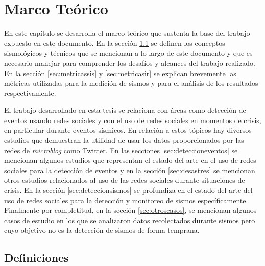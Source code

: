 \chapter{Marco Teórico}
\label{cap:marco}

En este capítulo se desarrolla el marco teórico que sustenta la base del trabajo expuesto en este documento. En la sección \ref{sec:glosario} se definen los conceptos sismológicos y técnicos que se mencionan a lo largo de este documento y que es necesario manejar para comprender los desafíos y alcances del trabajo realizado. En la sección \ref{sec:metricassis} y \ref{sec:metricasir} se explican brevemente las métricas utilizadas para la medición de sismos y para el análisis de los resultados respectivamente. 

El trabajo desarrollado en esta tesis se relaciona con áreas como detección de eventos usando redes sociales y con el uso de redes sociales en momentos de crisis, en particular durante eventos sísmicos. En relación a estos tópicos hay diversos estudios que demuestran la utilidad de usar los datos proporcionados por las redes de \textit{microblog} como Twitter. En las secciones \ref{sec:deteccioneventos} se mencionan algunos estudios que representan el estado del arte en el uso de redes sociales para la detección de eventos y en la sección \ref{sec:desastres} se mencionan otros estudios relacionados al uso de las redes sociales durante situaciones de crisis. 
En la sección \ref{sec:deteccionsismos} se profundiza en el estado del arte del uso de redes sociales para la detección y monitoreo de sismos específicamente. Finalmente por completitud, en la sección \ref{sec:otroscasos}, se mencionan algunos casos de estudio en los que se analizaron datos recolectados durante sismos pero cuyo objetivo no es la detección de sismos de forma temprana. 

\section{Definiciones}
\label{sec:glosario}

